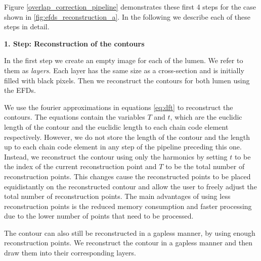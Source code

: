 \documentclass[thesis.tex]{subfiles}
\begin{document}
Figure \ref{overlap_correction_pipeline} demonstrates these first 4 steps for the case shown in \ref{fig:efds_reconstruction_a}.  
In the following we describe each of these steps in detail. 

\textbf{1. Step: Reconstruction of the contours}

In the first step we create an empty image for each of the lumen. We refer to them as \textit{layers}. Each layer has the same size as a cross-section and is initially filled with black pixels. Then we reconstruct the contours for both lumen using the EFDs.

We use the fourier approximations in equations \ref{eq:dft} to reconstruct the contours. The equations contain the variables $T$ and $t$, which are the euclidic length of the contour and the euclidic length to each chain code element respectively. However, we do not store the length of the contour and the length up to each chain code element in any step of the pipeline preceding this one. Instead, we reconstruct the contour using only the harmonics by setting $t$ to be the index of the current reconstruction point and $T$ to be the total number of reconstruction points. This changes cause the reconstructed points to be placed equidistantly on the reconstructed contour and allow the user to freely adjust the total number of reconstruction points. The main advantages of using less reconstruction points is the reduced memory consumption and faster processing due to the lower number of points that need to be processed.
 
The contour can also still be reconstructed in a gapless manner, by using enough reconstruction points. We reconstruct the contour in a gapless manner and then draw them into their corresponding layers. %

\end{document}
